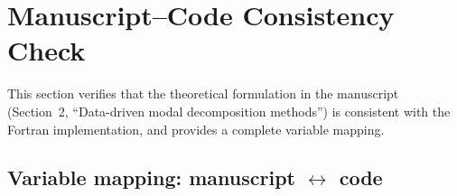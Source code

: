 \documentclass[11pt,a4paper]{article}
\begin{document}
\newpage
\section{Manuscript--Code Consistency Check}
\label{sec:consistency}

This section verifies that the theoretical formulation in the manuscript (Section~2, ``Data-driven modal decomposition methods'') is consistent with the Fortran implementation, and provides a complete variable mapping.

\subsection{Variable mapping: manuscript \texorpdfstring{$\longleftrightarrow$}{<->} code}
\end{document}
